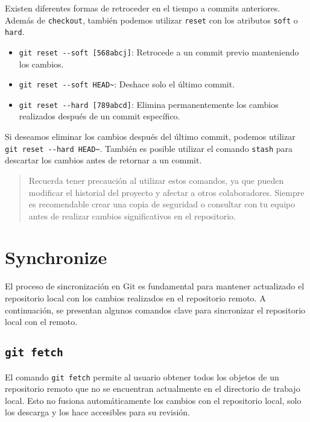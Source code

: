\documentclass[
  letterpaper,
  DIV=11,
  numbers=noendperiod]{scrartcl}
\providecommand{\tightlist}{%
  \setlength{\itemsep}{0pt}\setlength{\parskip}{0pt}}\usepackage{longtable,booktabs,array}
\begin{document}
Existen diferentes formas de retroceder en el tiempo a commits
anteriores. Además de \texttt{checkout}, también podemos utilizar
\texttt{reset} con los atributos \texttt{soft} o \texttt{hard}.

\begin{itemize}
\tightlist
\item
  \texttt{git\ reset\ -\/-soft\ {[}568abcj{]}}: Retrocede a un commit
  previo manteniendo los cambios.
\item
  \texttt{git\ reset\ -\/-soft\ HEAD\textasciitilde{}}: Deshace solo el
  último commit.
\item
  \texttt{git\ reset\ -\/-hard\ {[}789abcd{]}}: Elimina permanentemente
  los cambios realizados después de un commit específico.
\end{itemize}

Si deseamos eliminar los cambios después del último commit, podemos
utilizar \texttt{git\ reset\ -\/-hard\ HEAD\textasciitilde{}}. También
es posible utilizar el comando \texttt{stash} para descartar los cambios
antes de retornar a un commit.

\begin{quote}
Recuerda tener precaución al utilizar estos comandos, ya que pueden
modificar el historial del proyecto y afectar a otros colaboradores.
Siempre es recomendable crear una copia de seguridad o consultar con tu
equipo antes de realizar cambios significativos en el repositorio.
\end{quote}

\hypertarget{synchronize}{%
\section{Synchronize}\label{synchronize}}

El proceso de sincronización en Git es fundamental para mantener
actualizado el repositorio local con los cambios realizados en el
repositorio remoto. A continuación, se presentan algunos comandos clave
para sincronizar el repositorio local con el remoto.

\hypertarget{git-fetch}{%
\subsection{\texorpdfstring{\texttt{git\ fetch}}{git fetch}}\label{git-fetch}}

El comando \texttt{git\ fetch} permite al usuario obtener todos los
objetos de un repositorio remoto que no se encuentran actualmente en el
directorio de trabajo local. Esto no fusiona automáticamente los cambios
con el repositorio local, solo los descarga y los hace accesibles para
su revisión.
\end{document}
